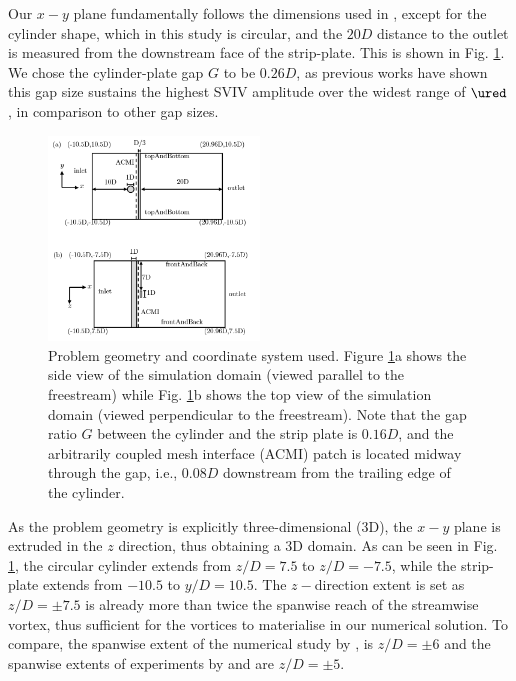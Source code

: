 \documentclass[a4paper,fleqn]{cas-sc}
\begin{document}
Our $x-y$ plane fundamentally follows the dimensions used in \citet{Maruai2017,Maruai2018}, except for the cylinder shape, which in this study is circular, and the $20D$ distance to the outlet is measured from the downstream face of the strip-plate. This is shown in Fig. \ref{fig:problemGeometry}. We chose the cylinder-plate gap $G$ to be $0.26D$, as previous works have shown this gap size sustains the highest SVIV amplitude over the widest range of $\ured$, in comparison to other gap sizes.

\begin{figure}
  \centering
  \includegraphics[width=0.5\textwidth]{figs/figure2}
  \caption{Problem geometry and coordinate system used. Figure \ref{fig:problemGeometry}a shows the side view of the simulation domain (viewed parallel to the freestream) while Fig. \ref{fig:problemGeometry}b shows the top view of the simulation domain (viewed perpendicular to the freestream). Note that the gap ratio $G$ between the cylinder and the strip plate is $0.16D$, and the arbitrarily coupled mesh interface (ACMI) patch is located midway through the gap, i.e., $0.08D$ downstream from the trailing edge of the cylinder.}
  \label{fig:problemGeometry}
\end{figure}

As the problem geometry is explicitly three-dimensional (3D), the $x-y$ plane is extruded in the $z$ direction, thus obtaining a 3D domain. As can be seen in Fig. \ref{fig:problemGeometry}, the circular cylinder extends from $z/D=7.5$ to $z/D=-7.5$, while the strip-plate extends from $-10.5$ to $y/D=10.5$. The $z-$direction extent is set as $z/D=\pm7.5$ is already more than twice the spanwise reach of the streamwise vortex, thus sufficient for the vortices to materialise in our numerical solution. To compare, the spanwise extent of the numerical study by \citet{Deng2007}, is $z/D=\pm6$ and the spanwise extents of experiments by \citet{Nguyen2012} and \citet{Koide2013} are $z/D=\pm5$.
\end{document}
